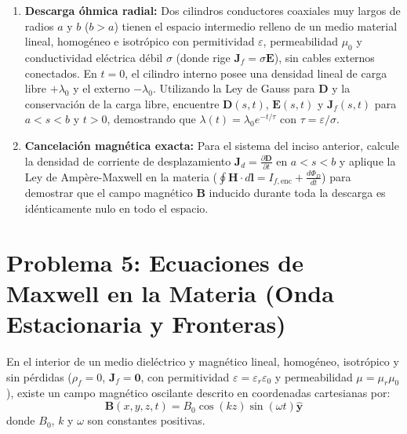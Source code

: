 \documentclass[11pt]{article}
\begin{document}
\begin{enumerate}
    \item[a)] \textbf{Descarga óhmica radial:} Dos cilindros conductores coaxiales muy largos de radios $a$ y $b$ ($b > a$) tienen el espacio intermedio relleno de un medio material lineal, homogéneo e isotrópico con permitividad $\varepsilon$, permeabilidad $\mu_0$ y conductividad eléctrica débil $\sigma$ (donde rige $\mathbf{J}_f = \sigma \mathbf{E}$), sin cables externos conectados. En $t = 0$, el cilindro interno posee una densidad lineal de carga libre $+\lambda_0$ y el externo $-\lambda_0$. Utilizando la Ley de Gauss para $\mathbf{D}$ y la conservación de la carga libre, encuentre $\mathbf{D}(s,t)$, $\mathbf{E}(s,t)$ y $\mathbf{J}_f(s,t)$ para $a < s < b$ y $t > 0$, demostrando que $\lambda(t) = \lambda_0 e^{-t/\tau}$ con $\tau = \varepsilon / \sigma$.
    \item[b)] \textbf{Cancelación magnética exacta:} Para el sistema del inciso anterior, calcule la densidad de corriente de desplazamiento $\mathbf{J}_d = \frac{\partial \mathbf{D}}{\partial t}$ en $a < s < b$ y aplique la Ley de Ampère-Maxwell en la materia ($\oint \mathbf{H} \cdot d\mathbf{l} = I_{f,\text{enc}} + \frac{d\Phi_D}{dt}$) para demostrar que el campo magnético $\mathbf{B}$ inducido durante toda la descarga es idénticamente nulo en todo el espacio.
\end{enumerate}

\vspace{0.3cm}

\newpage

\section*{Problema 5: Ecuaciones de Maxwell en la Materia (Onda Estacionaria y Fronteras)}

En el interior de un medio dieléctrico y magnético lineal, homogéneo, isotrópico y sin pérdidas ($\rho_f = 0$, $\mathbf{J}_f = \mathbf{0}$, con permitividad $\varepsilon = \varepsilon_r \varepsilon_0$ y permeabilidad $\mu = \mu_r \mu_0$), existe un campo magnético oscilante descrito en coordenadas cartesianas por:
\begin{equation}
    \mathbf{B}(x, y, z, t) = B_0 \cos(kz) \sin(\omega t) \hat{\mathbf{y}}
\end{equation}
donde $B_0$, $k$ y $\omega$ son constantes positivas.
\end{document}
